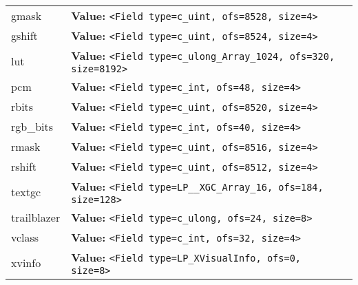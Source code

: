 \begin{longtable}{|p{\varnamewidth}|p{\vardescrwidth}|l}
\cline{1-2}
\raggedright g\-m\-a\-s\-k\- & \raggedright \textbf{Value:} 
{\tt {\textless}Field type=c\_uint, ofs=8528, size=4{\textgreater}}&\\
\cline{1-2}
\raggedright g\-s\-h\-i\-f\-t\- & \raggedright \textbf{Value:} 
{\tt {\textless}Field type=c\_uint, ofs=8524, size=4{\textgreater}}&\\
\cline{1-2}
\raggedright l\-u\-t\- & \raggedright \textbf{Value:} 
{\tt {\textless}Field type=c\_ulong\_Array\_1024, ofs=320, size=8192{\textgreater}}&\\
\cline{1-2}
\raggedright p\-c\-m\- & \raggedright \textbf{Value:} 
{\tt {\textless}Field type=c\_int, ofs=48, size=4{\textgreater}}&\\
\cline{1-2}
\raggedright r\-b\-i\-t\-s\- & \raggedright \textbf{Value:} 
{\tt {\textless}Field type=c\_uint, ofs=8520, size=4{\textgreater}}&\\
\cline{1-2}
\raggedright r\-g\-b\-\_\-b\-i\-t\-s\- & \raggedright \textbf{Value:} 
{\tt {\textless}Field type=c\_int, ofs=40, size=4{\textgreater}}&\\
\cline{1-2}
\raggedright r\-m\-a\-s\-k\- & \raggedright \textbf{Value:} 
{\tt {\textless}Field type=c\_uint, ofs=8516, size=4{\textgreater}}&\\
\cline{1-2}
\raggedright r\-s\-h\-i\-f\-t\- & \raggedright \textbf{Value:} 
{\tt {\textless}Field type=c\_uint, ofs=8512, size=4{\textgreater}}&\\
\cline{1-2}
\raggedright t\-e\-x\-t\-g\-c\- & \raggedright \textbf{Value:} 
{\tt {\textless}Field type=LP\_\_XGC\_Array\_16, ofs=184, size=128{\textgreater}}&\\
\cline{1-2}
\raggedright t\-r\-a\-i\-l\-b\-l\-a\-z\-e\-r\- & \raggedright \textbf{Value:} 
{\tt {\textless}Field type=c\_ulong, ofs=24, size=8{\textgreater}}&\\
\cline{1-2}
\raggedright v\-c\-l\-a\-s\-s\- & \raggedright \textbf{Value:} 
{\tt {\textless}Field type=c\_int, ofs=32, size=4{\textgreater}}&\\
\cline{1-2}
\raggedright x\-v\-i\-n\-f\-o\- & \raggedright \textbf{Value:} 
{\tt {\textless}Field type=LP\_XVisualInfo, ofs=0, size=8{\textgreater}}&\\
\cline{1-2}
\end{longtable}



